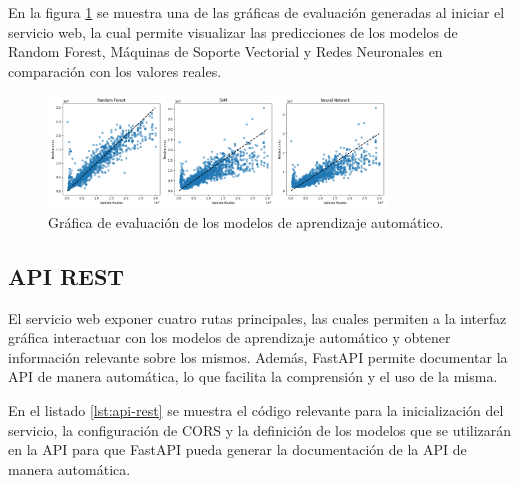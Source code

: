 En la figura \ref{fig:graficas-evaluacion} se muestra una de las gráficas de
evaluación generadas al iniciar el servicio web, la cual permite visualizar las
predicciones de los modelos de Random Forest, Máquinas de Soporte Vectorial y
Redes Neuronales en comparación con los valores reales.

\begin{figure}[H]
    \centering
    \includegraphics[width=0.8\textwidth]{imagenes/05-implementacion/servicio-web/plots.png}
    \caption{Gráfica de evaluación de los modelos de aprendizaje automático.}
    \label{fig:graficas-evaluacion}
\end{figure}

\subsection{API REST}
El servicio web exponer cuatro rutas principales, las cuales permiten a la
interfaz gráfica interactuar con los modelos de aprendizaje automático y obtener
información relevante sobre los mismos. Además, FastAPI permite documentar la API
de manera automática, lo que facilita la comprensión y el uso de la misma.

En el listado \ref{lst:api-rest} se muestra el código relevante para la
inicialización del servicio, la configuración de CORS y la definición de los modelos
que se utilizarán en la API para que FastAPI pueda generar la documentación de la
API de manera automática.

